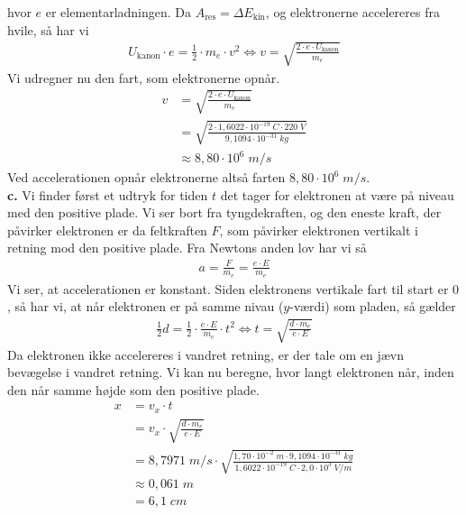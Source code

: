 \documentclass{report}
\begin{document}
hvor $e$ er elementarladningen. 
Da $A _{\text{res} }=\Delta E _{\text{kin} }$, og elektronerne accelereres fra hvile, så har vi 
\begin{equation*}
\begin{split}
  U _{\text{kanon} } \cdot e= \frac{1}{2} \cdot m_e \cdot v^2 \iff v=\sqrt{\frac{2 \cdot e \cdot U _{\text{kanon} }}{m_e}} 
\end{split}
\end{equation*}
Vi udregner nu den fart, som elektronerne opnår.
\begin{equation*}
\begin{split}
  v&=\sqrt{\frac{2 \cdot e \cdot U _{\text{kanon} }}{m_e}} \\
  &=\sqrt{\frac{2 \cdot 1,6022 \cdot 10 ^{-19} \;\unit{C} \cdot 220 \;\unit{V}}{9,1094 \cdot 10 ^{-31} \;\unit{kg} }} \\
  &\approx 8,80 \cdot 10^6 \;\unit{m/s} 
\end{split}
\end{equation*}
Ved accelerationen opnår elektronerne altså farten $8,80 \cdot 10^6 \;\unit{m/s} $.\\[1ex]
\textbf{c.}
Vi finder først et udtryk for tiden $t$ det tager for elektronen at være på niveau med den positive plade.
Vi ser bort fra tyngdekraften, og den eneste kraft, der påvirker elektronen er da feltkraften $F$, som påvirker elektronen vertikalt i retning mod den positive plade.
Fra Newtons anden lov har vi så
\begin{equation*}
\begin{split}
  a=\frac{F}{m_e}=\frac{e \cdot E}{m_e}
\end{split}
\end{equation*}
Vi ser, at accelerationen er konstant.
Siden elektronens vertikale fart til start er $0$, så har vi, at når elektronen er på samme nivau ($y$-værdi) som pladen, så gælder 
\begin{equation*}
\begin{split}
  \frac{1}{2} d =\frac{1}{2} \cdot \frac{e \cdot E}{m_e} \cdot t^2 \iff t=\sqrt{\frac{d \cdot m_e}{e \cdot E}} 
\end{split}
\end{equation*}
Da elektronen ikke accelereres i vandret retning, er der tale om en jævn bevægelse i vandret retning.
Vi kan nu beregne, hvor langt elektronen når, inden den når samme højde som den positive plade.
\begin{equation*}
\begin{split}
  x&=v_x \cdot t \\
  &=v_x \cdot \sqrt{\frac{d \cdot m_e}{e \cdot E}} \\
  &=8,7971 \;\unit{m/s} \cdot \sqrt{\frac{1,70 \cdot 10 ^{-2} \;\unit{m} \cdot 9,1094 \cdot 10 ^{-31} \;\unit{kg} }{1,6022 \cdot 10 ^{-19}\;\unit{C} \cdot 2,0 \cdot 10^3 \;\unit{V/m} }} \\
  &\approx 0,061 \;\unit{m} \\
  &=6,1 \;\unit{cm} 
\end{split}
\end{equation*}
\end{document}
